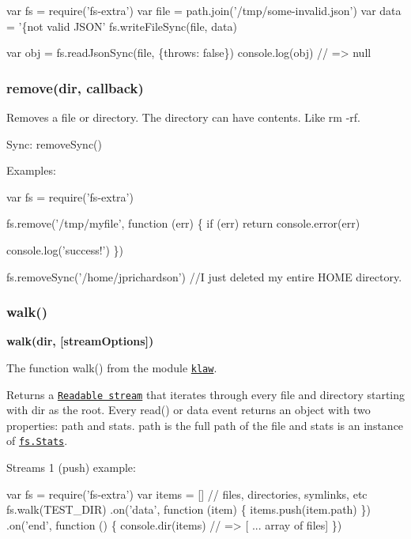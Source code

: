 \begin{DoxyCode}
var fs = require('fs-extra')
var file = path.join('/tmp/some-invalid.json')
var data = '\{not valid JSON'
fs.writeFileSync(file, data)

var obj = fs.readJsonSync(file, \{throws: false\})
console.log(obj) // => null
\end{DoxyCode}


\subsubsection*{remove(dir, callback)}

Removes a file or directory. The directory can have contents. Like {\ttfamily rm -\/rf}.

Sync\+: {\ttfamily remove\+Sync()}

Examples\+:


\begin{DoxyCode}
var fs = require('fs-extra')

fs.remove('/tmp/myfile', function (err) \{
  if (err) return console.error(err)

  console.log('success!')
\})

fs.removeSync('/home/jprichardson') //I just deleted my entire HOME directory.
\end{DoxyCode}


\subsubsection*{walk()}

{\bfseries walk(dir, \mbox{[}stream\+Options\mbox{]})}

The function {\ttfamily walk()} from the module \href{https://github.com/jprichardson/node-klaw}{\tt {\ttfamily klaw}}.

Returns a \href{https://nodejs.org/api/stream.html#stream_class_stream_readable}{\tt Readable stream} that iterates through every file and directory starting with {\ttfamily dir} as the root. Every {\ttfamily read()} or {\ttfamily data} event returns an object with two properties\+: {\ttfamily path} and {\ttfamily stats}. {\ttfamily path} is the full path of the file and {\ttfamily stats} is an instance of \href{https://nodejs.org/api/fs.html#fs_class_fs_stats}{\tt fs.\+Stats}.

Streams 1 (push) example\+:


\begin{DoxyCode}
var fs = require('fs-extra')
var items = [] // files, directories, symlinks, etc
fs.walk(TEST\_DIR)
  .on('data', function (item) \{
    items.push(item.path)
  \})
  .on('end', function () \{
    console.dir(items) // => [ ... array of files]
  \})
\end{DoxyCode}


